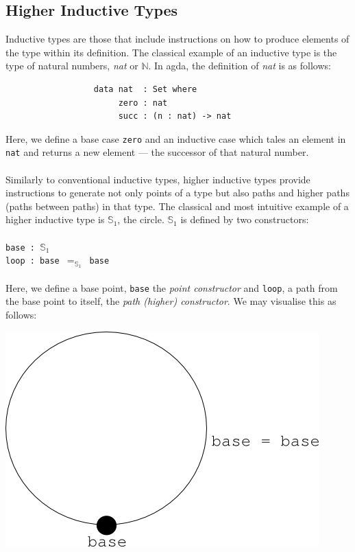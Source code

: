 \documentclass[12pt]{report}
\begin{document}
\subsection{Higher Inductive Types}
Inductive types are those that include instructions on how to produce elements of the type within its definition. The classical example of an inductive type is the type of natural numbers, \textit{nat} or $\mathbb{N}$. In agda, the definition of \textit{nat} is as follows:\\
\begin{verbatim}
                  data nat  : Set where
                       zero : nat
                       succ : (n : nat) -> nat
\end{verbatim}
Here, we define a base case \texttt{zero} and an inductive case which tales an element in \texttt{nat} and returns a new element --- the successor of that natural number. \\
\\
Similarly to conventional inductive types, higher inductive types provide instructions to generate not only points of a type but also paths and higher paths (paths between paths) in that type. The classical and most intuitive example of a higher inductive type is $\mathbb{S}_1$, the circle. $\mathbb{S}_1$ is defined by two constructors:\\
\\
\-\hspace{4cm}\texttt{base : $\mathbb{S}_1$}\\
\-\hspace{4cm}\texttt{loop : base $=_{\mathbb{S}_1}$ base}
\\
\\
Here, we define a base point, \texttt{base} the \textit{point constructor} and \texttt{loop}, a path from the base point to itself, the \textit{path (higher) constructor}. We may visualise this as follows:
\begin{center}
\includegraphics[scale=0.57]{3.png}
\end{center}
\end{document}
